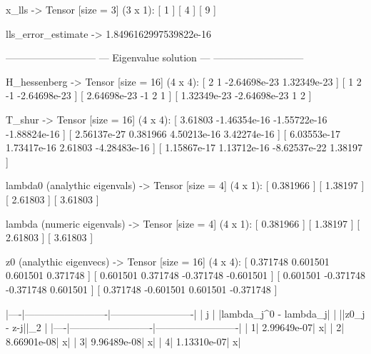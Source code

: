 \documentclass[a4paper,14pt]{extarticle}
\newenvironment{tinyverbatim}%
{\footnotesize\verbatim}%
{\endverbatim}
\begin{document}
\begin{tinyverbatim}
x_lls              -> Tensor [size = 3] (3 x 1):
  [ 1 ]
  [ 4 ]
  [ 9 ]

lls_error_estimate -> 1.8496162997539822e-16

---------------------------
--- Eigenvalue solution ---
---------------------------

H_hessenberg                  -> Tensor [size = 16] (4 x 4):
  [           2            1 -2.64698e-23  1.32349e-23 ]
  [           1            2           -1 -2.64698e-23 ]
  [ 2.64698e-23           -1            2            1 ]
  [ 1.32349e-23 -2.64698e-23            1            2 ]

T_shur                        -> Tensor [size = 16] (4 x 4):
  [     3.61803 -1.46354e-16 -1.55722e-16 -1.88824e-16 ]
  [ 2.56137e-27     0.381966  4.50213e-16  3.42274e-16 ]
  [ 6.03553e-17  1.73417e-16      2.61803 -4.28483e-16 ]
  [ 1.15867e-17  1.13712e-16 -8.62537e-22      1.38197 ]

lambda0 (analythic eigenvals) -> Tensor [size = 4] (4 x 1):
  [ 0.381966 ]
  [  1.38197 ]
  [  2.61803 ]
  [  3.61803 ]

lambda    (numeric eigenvals) -> Tensor [size = 4] (4 x 1):
  [ 0.381966 ]
  [  1.38197 ]
  [  2.61803 ]
  [  3.61803 ]

z0      (analythic eigenvecs) -> Tensor [size = 16] (4 x 4):
  [ 0.371748  0.601501  0.601501  0.371748 ]
  [ 0.601501  0.371748 -0.371748 -0.601501 ]
  [ 0.601501 -0.371748 -0.371748  0.601501 ]
  [ 0.371748 -0.601501  0.601501 -0.371748 ]

|----|-------------------------|-------------------------|
|  j | |lambda_j^0 - lambda_j| |        ||z0_j - z-j||_2 |
|----|-------------------------|-------------------------|
|   1|              2.99649e-07|                        x|
|   2|              8.66901e-08|                        x|
|   3|              9.96489e-08|                        x|
|   4|              1.13310e-07|                        x|
\end{tinyverbatim}
\end{document}
